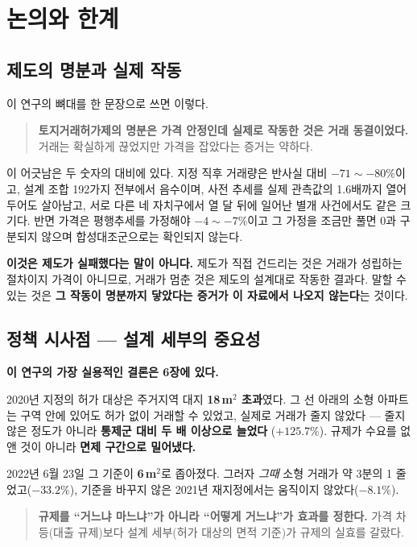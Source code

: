 
\section{논의와 한계}

\subsection{제도의 명분과 실제 작동}

이 연구의 뼈대를 한 문장으로 쓰면 이렇다.

\begin{quote}
\textbf{토지거래허가제의 명분은 가격 안정인데 실제로 작동한 것은 거래
동결이었다.} 거래는 확실하게 끊었지만 가격을 잡았다는 증거는 약하다.
\end{quote}

이 어긋남은 두 숫자의 대비에 있다. 지정 직후 거래량은 반사실 대비
$-71 \sim -80\%$이고, 설계 조합 192가지 전부에서 음수이며, 사전 추세를 실제
관측값의 1.6배까지 열어 두어도 살아남고, 서로 다른 네 자치구에서 열 달 뒤에
일어난 별개 사건에서도 같은 크기다. 반면 가격은 평행추세를 가정해야 $-4 \sim
-7\%$이고 그 가정을 조금만 풀면 0과 구분되지 않으며 합성대조군으로는 확인되지
않는다.

\textbf{이것은 제도가 실패했다는 말이 아니다.} 제도가 직접 건드리는 것은 거래가
성립하는 절차이지 가격이 아니므로, 거래가 멈춘 것은 제도의 설계대로 작동한
결과다. 말할 수 있는 것은 \textbf{그 작동이 명분까지 닿았다는 증거가 이 자료에서
나오지 않는다}는 것이다.

\subsection{정책 시사점 --- 설계 세부의 중요성}

\textbf{이 연구의 가장 실용적인 결론은 6장에 있다.}

2020년 지정의 허가 대상은 주거지역 대지 \textbf{18\,m$^2$ 초과}였다. 그 선 아래의
소형 아파트는 구역 안에 있어도 허가 없이 거래할 수 있었고, 실제로 거래가 줄지
않았다 --- 줄지 않은 정도가 아니라 \textbf{통제군 대비 두 배 이상으로 늘었다}
($+125.7\%$). 규제가 수요를 없앤 것이 아니라 \textbf{면제 구간으로 밀어냈다.}

2022년 6월 23일 그 기준이 \textbf{6\,m$^2$}로 좁아졌다. 그러자 \emph{그때} 소형
거래가 약 3분의 1 줄었고($-33.2\%$), 기준을 바꾸지 않은 2021년 재지정에서는
움직이지 않았다($-8.1\%$).

\begin{quote}
\textbf{규제를 ``거느냐 마느냐''가 아니라 ``어떻게 거느냐''가 효과를 정한다.}
가격 차등(대출 규제)보다 설계 세부(허가 대상의 면적 기준)가 규제의 실효를 갈랐다.
\end{quote}

